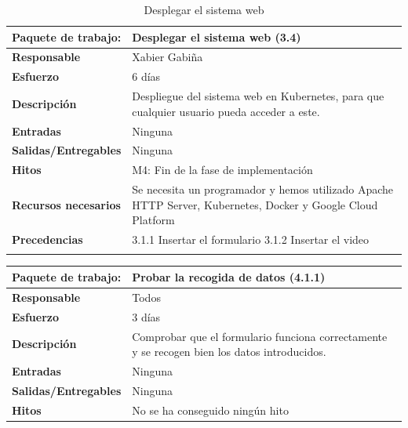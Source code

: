 \documentclass{report}
\begin{document}
\begin{center}
\begin{longtable}{|p{6cm}|p{6cm}|}
                    \hline
                    \textbf{Paquete de trabajo:} & Desplegar el sistema web (3.4)\\
                    \hline
                    \textbf{Responsable} & Xabier Gabiña\\
                    \hline
                    \textbf{Esfuerzo} & 6 días\\
                    \hline
                    \textbf{Descripción} & Despliegue del sistema web en Kubernetes, para que cualquier usuario pueda acceder a este.\\
                    \hline
                    \textbf{Entradas} & Ninguna\\
                    \hline
                    \textbf{Salidas/Entregables} & Ninguna \\
                    \hline
                    \textbf{Hitos} & M4: Fin de la fase de implementación\\
                    \hline
                    \textbf{Recursos necesarios} & Se necesita un programador y hemos utilizado Apache HTTP Server, Kubernetes, Docker y Google Cloud Platform\\
                    \hline
                    \textbf{Precedencias} & 3.1.1 Insertar el formulario
                                            3.1.2 Insertar el video\\
                    \hline
                    \caption{Desplegar el sistema web}
                \end{longtable}
                \begin{longtable}{|p{6cm}|p{6cm}|}
                    \hline
                    \textbf{Paquete de trabajo:} & Probar la recogida de datos (4.1.1)\\
                    \hline
                    \textbf{Responsable} & Todos\\
                    \hline
                    \textbf{Esfuerzo} & 3 días\\
                    \hline
                    \textbf{Descripción} & Comprobar que el formulario funciona correctamente y se recogen bien los datos introducidos.\\
                    \hline
                    \textbf{Entradas} & Ninguna\\
                    \hline
                    \textbf{Salidas/Entregables} & Ninguna \\
                    \hline
                    \textbf{Hitos} & No se ha conseguido ningún hito\\

\end{longtable}
\end{center}
\end{document}
